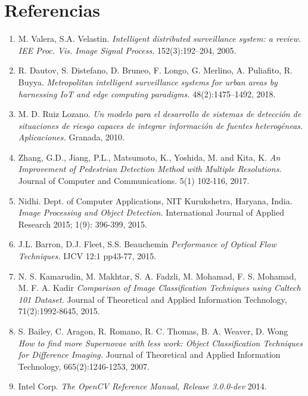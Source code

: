 \documentclass[a4paper,12pt,oneside,spanish]{book}
\begin{document}
\chapter{Referencias}
\setlength{\parskip}{-1.0em}
\setlength{\parindent}{0em}
\begin{enumerate}
	\item M. Valera, S.A. Velastin. \textit{Intelligent distributed surveillance system: a review. IEE Proc. Vis. Image Signal Process.} 152(3):192–204, 2005.
	
	\item R. Dautov, S. Distefano, D. Bruneo, F. Longo, G. Merlino, A. Puliafito, R. Buyya. \textit{Metropolitan intelligent surveillance systems for urban areas by harnessing IoT and edge computing paradigms.} 48(2):1475–1492, 2018.

	\item M. D. Ruiz Lozano. \textit{Un modelo para el desarrollo de sistemas de detección de situaciones de riesgo capaces de integrar información de fuentes heterogéneas. Aplicaciones.} Granada, 2010.

	\item Zhang, G.D., Jiang, P.L., Matsumoto, K., Yoshida, M. and Kita, K. \textit{An Improvement of Pedestrian Detection Method with Multiple Resolutions.} Journal of Computer and Communications. 5(1) 102-116, 2017.

	\item Nidhi. Dept. of Computer Applications, NIT Kurukshetra, Haryana, India. \textit{Image Processing and Object Detection.} International Journal of Applied Research 2015; 1(9): 396-399, 2015.
	
	\item J.L. Barron, D.J. Fleet, S.S. Beauchemin \textit{Performance of Optical Flow Techniques.} IJCV 12:1 pp43-77, 2015.
	
	\item N. S. Kamarudin, M. Makhtar, S. A. Fadzli, M. Mohamad, F. S. Mohamad, M. F. A. Kadir \textit{Comparison of Image Classification Techniques using Caltech 101 Dataset.} Journal of Theoretical and Applied Information Technology, 71(2):1992-8645, 2015.
	
	\item S. Bailey, C. Aragon, R. Romano, R. C. Thomas, B. A. Weaver, D. Wong \textit{How to find more Supernovae with less work: Object Classification Techniques for Difference Imaging.} Journal of Theoretical and Applied Information Technology, 665(2):1246-1253, 2007.
	
	\item Intel Corp. \textit{The OpenCV Reference Manual, Release 3.0.0-dev} 2014. 
			

\end{enumerate}
\end{document}
